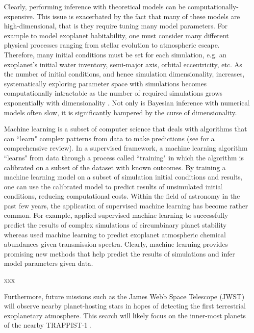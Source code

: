 Clearly, performing inference with theoretical models can be computationally-expensive. This issue is exacerbated by the fact that many of these models are high-dimensional, that is they require tuning many model parameters. For example to model exoplanet habitability, one must consider many different physical processes ranging from stellar evolution to atmospheric escape. Therefore, many initial conditions must be set for each simulation, e.g. an exoplanet's initial water inventory, semi-major axis, orbital eccentricity, etc.  As the number of initial conditions, and hence simulation dimensionality, increases, systematically exploring parameter space with simulations becomes computationally intractable as the number of required simulations grows exponentially with dimensionality \citep{Bellman1957}.  Not only is Bayesian inference with numerical models often slow, it is significantly hampered by the curse of dimensionality. 

Machine learning is a subset of computer science that deals with algorithms that can ``learn" complex patterns from data to make predictions (see \citet{Murphy2012} for a comprehensive review).  In a supervised framework, a machine learning algorithm ``learns" from data through a process called ``training" in which the algorithm is calibrated on a subset of the dataset with known outcomes.  By training a machine learning model on a subset of simulation initial conditions and results, one can use the calibrated model to predict results of unsimulated initial conditions, reducing computational costs.  Within the field of astronomy in the past few years, the application of supervised machine learning has become rather common. For example, \citet{Lam2018} applied supervised machine learning to successfully predict the results of complex simulations of circumbinary planet stability whereas \citet{Waldmann2016} used machine learning to predict exoplanet atmospheric chemical abundances given transmission spectra. Clearly, machine learning provides promising new methods that help predict the results of simulations and infer model parameters given data.

xxx

Furthermore, future missions such as the James Webb Space Telescope (JWST) will observe nearby planet-hosting stars in hopes of detecting the first terrestrial exoplanetary atmosphere. This search will likely focus on the inner-most planets of the nearby TRAPPIST-1 \citep{Morley2017,Lincowski2018,Lustig2019}. 

